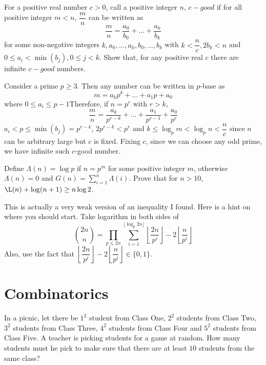\documentclass{subfile}
\begin{document}
		\begin{problem}
			For a positive real number $c>0$, call a positive integer $n$, $c-good$ if for all positive integer $m<n$, $\dfrac mn$ can be written as \[\dfrac mn=\dfrac{a_0}{b_0}+\ldots+\dfrac{a_k}{b_k}\]
			for some non-negative integers $k,a_0,...,a_k,b_0,...,b_k$ with $k<\dfrac nc, 2b_k< n$ and $0\leq a_i< \min(b_j),0\leq j<k$.
			Show that, for any positive real $c$ there are infinite $c-good$ numbers.
		\end{problem}
		
		\begin{solution}
			Consider a prime $p\geq3$. Then any number can be written in $p$-base as
			\[m=a_kp^k+\ldots+a_1p+a_0\]
			where $0\leq a_i\leq p-1$Therefore, if $n=p^r$ with $r>k$, \[\dfrac{m}{n}=\dfrac{a_k}{p^{r-k}}+\ldots+\dfrac{a_1}{p^{r-1}}+\dfrac{a_0}{p^r}\]
			$a_i<p\leq \min(b_j)=p^{r-k}$, $2p^{r-k}<p^r$ and $k\leq \log_p{m}<\log_p{n}<\dfrac{n}{c}$ since $n$ can be arbitrary large but $c$ is fixed. Fixing $c$, since we can choose any odd prime, we have infinite such $c$-good number.
		\end{solution}
		
		\begin{problem}
			Define $\Lambda(n)=\log p$ if $n=p^m$ for some positive integer $m$, otherwise $\Lambda(n)=0$ and $G(n)=\sum\limits_{i=1}^{n} \Lambda(i)$. Prove that for $n>10$, $\L(n)+\log(n+1)\geq n\log2$.
		\end{problem}
		
		\begin{hint}
			This is actually a very weak version of an inequality I found. Here is a hint on where you should start. Take logarithm in both sides of \[\binom{2n}{n}=\prod\limits_{p\leq2n}\sum\limits_{i=1}^{\lfloor\log_p{2n}\rfloor}\left\lfloor\dfrac{2n}{p^i}\right\rfloor-2\left\lfloor\dfrac{n}{p^i}\right\rfloor\]
			Also, use the fact that $\left\lfloor\dfrac{2n}{p^i}\right\rfloor-2\left\lfloor\dfrac{n}{p^i}\right\rfloor\in\{0,1\}$.
		\end{hint}
		
		\newpage
		
		\section{Combinatorics}
		
		\begin{problem}
			In a picnic, let there be $1^2$ student from Class One, $2^2$ students from Class Two, $3^2$ students from Class Three, $4^2$ students from Class Four and $5^2$ students from Class Five. A teacher is picking students for a game at random. How many students must he pick to make sure that there are at least $10$ students from the same class?
		\end{problem}
		
\end{document}
